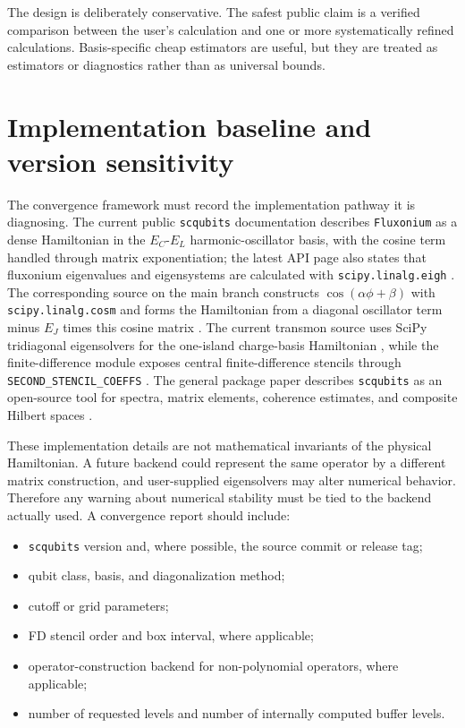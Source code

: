 \documentclass[11pt,a4paper]{article}
\begin{document}
The design is deliberately conservative.  The safest public claim is a verified comparison between the user's calculation and one or more systematically refined calculations.  Basis-specific cheap estimators are useful, but they are treated as estimators or diagnostics rather than as universal bounds.


\section{Implementation baseline and version sensitivity}

The convergence framework must record the implementation pathway it is diagnosing.  The current public \texttt{scqubits} documentation describes \texttt{Fluxonium} as a dense Hamiltonian in the $E_C$-$E_L$ harmonic-oscillator basis, with the cosine term handled through matrix exponentiation; the latest API page also states that fluxonium eigenvalues and eigensystems are calculated with \texttt{scipy.linalg.eigh} \cite{scqubits_fluxonium_api}.  The corresponding source on the main branch constructs \(\cos(\alpha\phi+\beta)\) with \texttt{scipy.linalg.cosm} and forms the Hamiltonian from a diagonal oscillator term minus \(E_J\) times this cosine matrix \cite{scqubits_fluxonium_source}.  The current transmon source uses SciPy tridiagonal eigensolvers for the one-island charge-basis Hamiltonian \cite{scqubits_transmon_source}, while the finite-difference module exposes central finite-difference stencils through \texttt{SECOND\_STENCIL\_COEFFS} \cite{scqubits_discretization_source}.  The general package paper describes \texttt{scqubits} as an open-source tool for spectra, matrix elements, coherence estimates, and composite Hilbert spaces \cite{scqubits_paper}.

These implementation details are not mathematical invariants of the physical Hamiltonian.  A future backend could represent the same operator by a different matrix construction, and user-supplied eigensolvers may alter numerical behavior.  Therefore any warning about numerical stability must be tied to the backend actually used.  A convergence report should include:
\begin{itemize}
\item \texttt{scqubits} version and, where possible, the source commit or release tag;
\item qubit class, basis, and diagonalization method;
\item cutoff or grid parameters;
\item FD stencil order and box interval, where applicable;
\item operator-construction backend for non-polynomial operators, where applicable;
\item number of requested levels and number of internally computed buffer levels.
\end{itemize}
\end{document}
